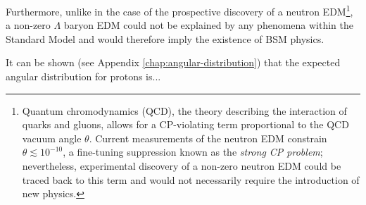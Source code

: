 Furthermore, unlike in the case of the prospective discovery of a neutron
EDM\footnote{Quantum chromodynamics (QCD), the theory describing the interaction of quarks and gluons, allows for a CP-violating term proportional to the QCD vacuum angle $\theta$. Current measurements of the neutron EDM constrain $\theta \lesssim {10}^{-10}$, a fine-tuning suppression known as the \textit{strong CP problem}; nevertheless, experimental discovery of a non-zero neutron EDM could be traced back to this term and would not necessarily require the introduction of new physics.},
a non-zero $\Lambda$ baryon EDM could not be explained by any phenomena within the Standard Model and would therefore imply the existence of BSM physics.

It can be shown (see Appendix \ref{chap:angular-distribution}) that the expected angular distribution for protons is...